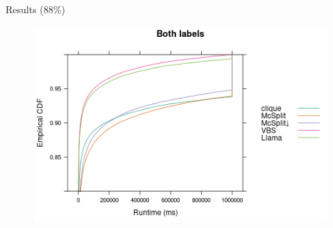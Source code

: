 \documentclass{beamer}
\begin{document}
\begin{frame}{Results (88\%)}
  \begin{figure}
    \centering
    \includegraphics[width=\textwidth]{../dissertation/images/ecdf_both_labels_llama.png}
  \end{figure}
\end{frame}

\end{document}
